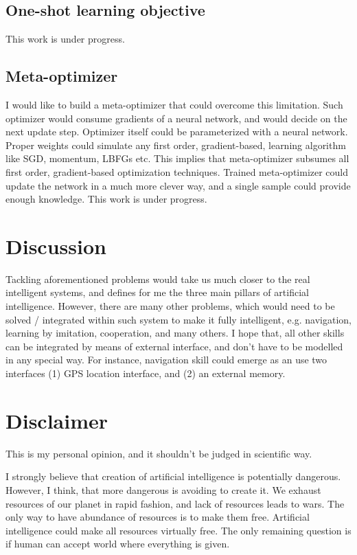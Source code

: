 \documentclass{article}
\begin{document}
\subsection{One-shot learning objective}


This work is under progress.

\subsection{Meta-optimizer}
I would like to build a meta-optimizer that could 
overcome this limitation. Such optimizer would consume gradients of a neural network, 
and would decide on the next update step. Optimizer itself could be parameterized 
with a neural network. Proper weights could simulate any first order, gradient-based, 
learning algorithm like SGD, momentum, LBFGs etc. This implies that meta-optimizer 
subsumes all first order, gradient-based optimization techniques. Trained meta-optimizer 
could update the network in a much more clever way, and a single sample could provide enough knowledge.
This work is under progress.


\section{Discussion}
Tackling aforementioned problems would take us much closer to the
real intelligent systems, and defines for me the three main pillars 
of artificial intelligence. However, there are many other problems, which 
would need to be solved / integrated within such system to make it fully 
intelligent, e.g. navigation, learning by imitation, cooperation, and many others.
I hope that, all other skills can be integrated by means of external interface, and
don't have to be modelled in any special way. For instance, navigation skill could emerge 
as an use two interfaces (1) GPS location interface, and (2) an external memory.


\section{Disclaimer}
This is my personal opinion, and it shouldn't be judged in scientific way.


I strongly believe that creation of artificial intelligence is potentially
dangerous. However, I think, that more dangerous is avoiding to create it.
We exhaust resources of our planet in rapid fashion, and lack of resources 
leads to wars. The only way to have abundance of resources is to make them free.
Artificial intelligence could make all resources virtually free. The only remaining
question is if human can accept world where everything is given.




\end{document}
